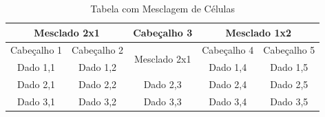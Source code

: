\begin{prob}
    
\end{prob}
\begin{table}[h]
\centering
\caption{Tabela com Mesclagem de Células}
\label{tab:mesclagem}
\begin{tabular}{|c|c|c|c|c|}
\hline
\multicolumn{2}{|c|}{Mesclado 2x1} & Cabeçalho 3 & \multicolumn{2}{c|}{Mesclado 1x2} \\ \hline
Cabeçalho 1 & Cabeçalho 2 & \multirow{2}{*}{Mesclado 2x1} & Cabeçalho 4 & Cabeçalho 5 \\ \cline{1-2} \cline{4-5}
Dado 1,1 & Dado 1,2 & & Dado 1,4 & Dado 1,5 \\ \hline
Dado 2,1 & Dado 2,2 & Dado 2,3 & Dado 2,4 & Dado 2,5 \\ \hline
Dado 3,1 & Dado 3,2 & Dado 3,3 & Dado 3,4 & Dado 3,5 \\ \hline
\end{tabular}
\end{table}




%
